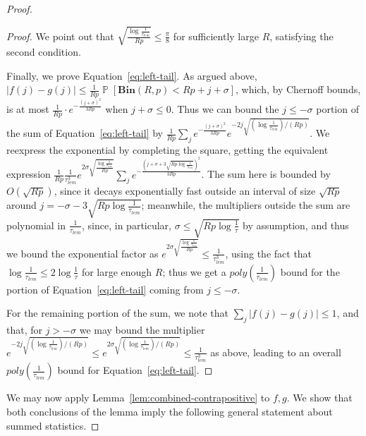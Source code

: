 \documentclass[10pt,a4paper]{amsart}
\newcommand{\Bin}[2]{\textbf{Bin}(#1,#2)}
\renewcommand{\Pr}{\operatorname*{\mathbb{P}}}
\begin{document}
\begin{proof}
\begin{proof}
    We point out that $\sqrt{\frac{\log\frac{1}{\tau_{lem}}}{Rp}}\leq \frac{\pi}{8}$ for sufficiently large $R$, satisfying the second condition.

    Finally, we prove Equation~\ref{eq:left-tail}. As argued above, $|f(j)-g(j)|\leq \frac{1}{Rp}\Pr[\Bin{R}{p}<Rp+j+\sigma]$, which, by Chernoff bounds, is at most $\frac{1}{Rp}\cdot e^{-\frac{(j+\sigma)^2}{3Rp}}$ when $j+\sigma\leq 0$. Thus we can bound the $j\leq -\sigma$ portion of the sum of Equation~\ref{eq:left-tail} by $\frac{1}{Rp}\sum_j e^{-\frac{(j+\sigma)^2}{3Rp}}e^{-2j\sqrt{(\log\frac{1}{\tau_{lem}})/(Rp)}}$. We reexpress the exponential by completing the square, getting the equivalent expression $\frac{1}{Rp}\frac{1}{\tau_{lem}^3}e^{2\sigma\sqrt{\frac{\log\frac{1}{\tau_{lem}}}{Rp}}}\sum_j e^{-\frac{\left(j+\sigma+3\sqrt{Rp\log\frac{1}{\tau_{lem}}}\right)^2}{3Rp}}$. The sum here is bounded by $O(\sqrt{Rp})$, since it decays exponentially fast outside an interval of size $\sqrt{Rp}$ around $j=-\sigma-3\sqrt{Rp\log\frac{1}{\tau_{lem}}}$; meanwhile, the multipliers outside the sum are polynomial in $\frac{1}{\tau_{lem}}$, since, in particular, $\sigma\leq  \sqrt{Rp\log\frac{1}{\tau}}$ by assumption, and thus we bound the exponential factor as $e^{2\sigma\sqrt{\frac{\log\frac{1}{\tau_{lem}}}{Rp}}}\leq \frac{1}{\tau_{lem}^{3 }}$, using the fact that $\log\frac{1}{\tau_{lem}}\leq 2\log\frac{1}{\tau}$ for large enough $R$; thus we get a $poly(\frac{1}{\tau_{lem}})$ bound for the portion of Equation~\ref{eq:left-tail} coming from $j\leq -\sigma$.

    For the remaining portion of the sum, we note that $\sum_j |f(j)-g(j)|\leq 1$, and that, for $j>-\sigma$ we may bound the multiplier $e^{-2j\sqrt{(\log\frac{1}{\tau_{lem}})/(Rp)}}\leq e^{2\sigma\sqrt{(\log\frac{1}{\tau_{lem}})/(Rp)}}\leq \frac{1}{\tau_{lem}^{3 }}$ as above, leading to an overall $poly(\frac{1}{\tau_{lem}})$ bound for Equation~\ref{eq:left-tail}.
\end{proof}

We may now apply Lemma~\ref{lem:combined-contrapositive} to $f,g$. We show that both conclusions of the lemma imply the following general statement about summed statistics. 


\end{proof}
\end{document}

